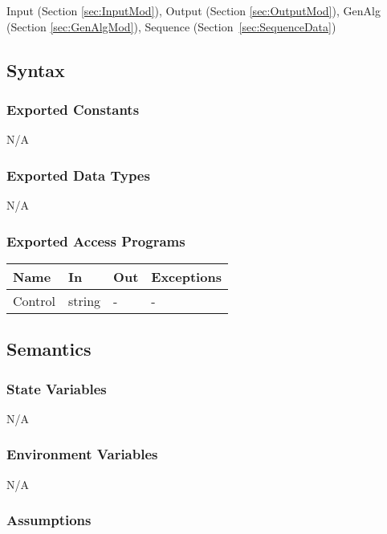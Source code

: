 \documentclass[12pt, titlepage]{article}
\begin{document}
Input (Section \ref{sec:InputMod}), Output (Section \ref{sec:OutputMod}), 
GenAlg (Section \ref{sec:GenAlgMod}), Sequence (Section~\ref{sec:SequenceData})

\subsection{Syntax}

\subsubsection{Exported Constants}
N/A

\subsubsection{Exported Data Types}
N/A

\subsubsection{Exported Access Programs}

\begin{center}
\renewcommand*{\arraystretch}{1.5}
\begin{tabular} {p{}  p{}  p{} 
p{} } \hline 
\textbf{Name} & \textbf{In} & \textbf{Out} & \textbf{Exceptions} \\ \hline

  Control & string & - & - \\ \hline
\end{tabular}
\end{center}

\subsection{Semantics}

\subsubsection{State Variables}

N/A

\subsubsection{Environment Variables}

N/A

\subsubsection{Assumptions}
\end{document}
